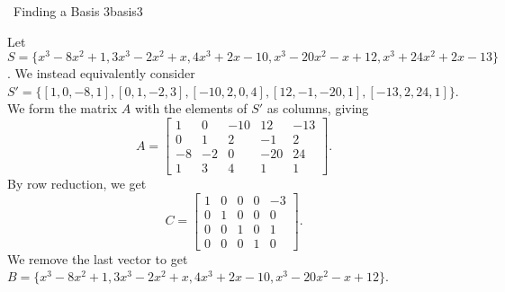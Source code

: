         \begin{example}{\Difficulty\,\Difficulty\,\,Finding a Basis 3}{basis3}

            Let \(S=\{x^3-8x^2+1,3x^3-2x^2+x,4x^3+2x-10,x^3-20x^2-x+12,x^3+24x^2+2x-13\}\). We instead equivalently consider \(S'=\{[1,0,-8,1],[0,1,-2,3],[-10,2,0,4],[12,-1,-20,1],[-13,2,24,1]\}\). We form the matrix \(A\) with the elements of \(S'\) as columns, giving
            \begin{equation*}
                A=\begin{bmatrix}
                   1 & 0 & -10 & 12 & -13 \\
                   0 & 1 & 2 & -1 & 2 \\
                   -8 & -2 & 0 & -20 & 24 \\
                   1 & 3 & 4 & 1 & 1
                \end{bmatrix}.
            \end{equation*}
            By row reduction, we get
            \begin{equation*}
                C=\begin{bmatrix}
                    1 & 0 & 0 & 0 & -3 \\
                    0 & 1 & 0 & 0 & 0 \\
                    0 & 0 & 1 & 0 & 1 \\
                    0 & 0 & 0 & 1 & 0
                \end{bmatrix}.
            \end{equation*} 
            We remove the last vector to get \(B=\{x^3-8x^2+1,3x^3-2x^2+x,4x^3+2x-10,x^3-20x^2-x+12\}\).
        \end{example}
